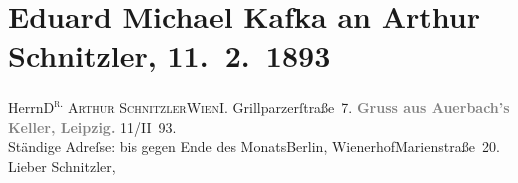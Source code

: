 

         
         \renewcommand{\erwaehntePersonen}{Personen: Josef Jarno, Angelo Neumann, Gilbert Otto Neumann-Hofer, Josef Simon, Johann Strauss}
         \renewcommand{\erwaehnteInstitutionen}{Institutionen: F. und P. Lehmann, Magazin für die Literatur des Auslandes, Saisontheater Ischl}
         \renewcommand{\erwaehnteOrte}{Orte: Auerbachs Keller, Bad Ischl, Berlin, Grillparzerstraße, I., Innere Stadt, Leipzig, Marienstraße, Prag, Raffaelova, Residenztheater Berlin, Wien, Wienerhof, Wilsonova}
         \renewcommand{\erwaehnteWerke}{Werke: Abschiedssouper, Anatol, Die Frage an das Schicksal}
               \section[Eduard Michael Kafka an Arthur Schnitzler, 11. 2. 1893]{ Eduard Michael Kafka an Arthur Schnitzler, 11. 2. 1893}\nopagebreak{}\rehead{ }\begin{ledgroupsized}[t]{13cm}\normalsize\beginnumbering \toendnotes[C]{\smallbreak\pagebreak[2]} 
\toendnotes[C]{\smallbreak}\pstart{}{\pb}Herrn\pend{}\pstart{}\textsc{D\textsuperscript{r.} Arthur Schnitzler}\pend{}\pstart{}\textsc{Wien}\pend{}\pstart{}I. Grillparzerſtraße 7. \pend{}{\bigskip}\pstart
           \noindent{}\centering{}{\pb}\textcolor{gray}{\textbf{Gruss aus Auerbach’s
                                Keller, Leipzig.}}\pend
           \pstart
           \raggedleft{}11/II 93.{\\}Ständige Adreſse: \introOben{}bis gegen
                            Ende des Monats\introOben{}{ }Berlin, WienerhofMarienstraße 20.\pend
           \pstart{}Lieber Schnitzler,\pend\pstart

\end{ledgroupsized}
